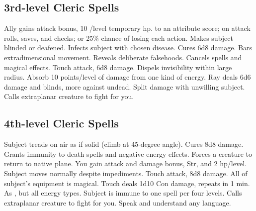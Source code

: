 \subsection{3rd-level Cleric Spells}
\begin{spelllist}
 Ally gains  attack bonus, 10 /level temporary hp.
  to an attribute score;  on attack rolls, saves, and checks; or 25\% chance of losing each action.
 Makes subject blinded or deafened.
 Infects subject with chosen disease.
 Cures 6d8 damage.
 Bars extradimensional movement.
 Reveals deliberate falsehoods.
 Cancels spells and magical effects.
 Touch attack, 6d8 damage.
 Dispels invisibility within large radius.
 Absorb 10 points/level of damage from one kind of energy.
 Ray deals 6d6 damage and blinds, more against undead.
  Split damage with unwilling subject.
 Calls extraplanar creature to fight for you.
\end{spelllist}

\subsection{4th-level Cleric Spells}
\begin{spelllist}
 Subject treads on air as if solid (climb at 45-degree angle).
 Cures 8d8 damage.
 Grants immunity to death spells and negative energy effects.
 Forces a creature to return to native plane.
 You gain attack and damage bonus,  Str, and 2 hp/level.
 Subject moves normally despite impediments.
 Touch attack, 8d8 damage.
 All of subject's equipment is magical.
 Touch deals 1d10 Con damage, repeats in 1 min.
 As , but all energy types.
 Subject is immune to one spell per four levels.
 Calls extraplanar creature to fight for you.
 Speak and understand any language.
\end{spelllist}

